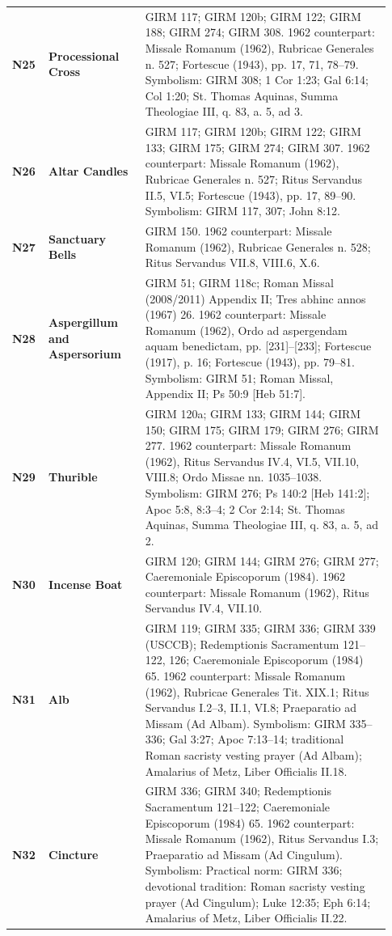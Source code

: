 {\begin{longtable}{>{\raggedright\arraybackslash}p{0.08\linewidth}>{\raggedright\arraybackslash}p{0.24\linewidth}>{\raggedright\arraybackslash}p{0.61\linewidth}}
\textbf{N25} & \textbf{Processional Cross} & GIRM 117; GIRM 120b; GIRM 122; GIRM 188; GIRM 274; GIRM 308. 1962 counterpart: Missale Romanum (1962), Rubricae Generales n. 527; Fortescue (1943), pp. 17, 71, 78--79. Symbolism: GIRM 308; 1 Cor 1:23; Gal 6:14; Col 1:20; St. Thomas Aquinas, Summa Theologiae III, q. 83, a. 5, ad 3. \\
\textbf{N26} & \textbf{Altar Candles} & GIRM 117; GIRM 120b; GIRM 122; GIRM 133; GIRM 175; GIRM 274; GIRM 307. 1962 counterpart: Missale Romanum (1962), Rubricae Generales n. 527; Ritus Servandus II.5, VI.5; Fortescue (1943), pp. 17, 89--90. Symbolism: GIRM 117, 307; John 8:12. \\
\textbf{N27} & \textbf{Sanctuary Bells} & GIRM 150. 1962 counterpart: Missale Romanum (1962), Rubricae Generales n. 528; Ritus Servandus VII.8, VIII.6, X.6. \\
\textbf{N28} & \textbf{Aspergillum and Aspersorium} & GIRM 51; GIRM 118c; Roman Missal (2008/2011) Appendix II; Tres abhinc annos (1967) 26. 1962 counterpart: Missale Romanum (1962), Ordo ad aspergendam aquam benedictam, pp. [231]--[233]; Fortescue (1917), p. 16; Fortescue (1943), pp. 79--81. Symbolism: GIRM 51; Roman Missal, Appendix II; Ps 50:9 [Heb 51:7]. \\
\textbf{N29} & \textbf{Thurible} & GIRM 120a; GIRM 133; GIRM 144; GIRM 150; GIRM 175; GIRM 179; GIRM 276; GIRM 277. 1962 counterpart: Missale Romanum (1962), Ritus Servandus IV.4, VI.5, VII.10, VIII.8; Ordo Missae nn. 1035--1038. Symbolism: GIRM 276; Ps 140:2 [Heb 141:2]; Apoc 5:8, 8:3--4; 2 Cor 2:14; St. Thomas Aquinas, Summa Theologiae III, q. 83, a. 5, ad 2. \\
\textbf{N30} & \textbf{Incense Boat} & GIRM 120; GIRM 144; GIRM 276; GIRM 277; Caeremoniale Episcoporum (1984). 1962 counterpart: Missale Romanum (1962), Ritus Servandus IV.4, VII.10. \\
\textbf{N31} & \textbf{Alb} & GIRM 119; GIRM 335; GIRM 336; GIRM 339 (USCCB); Redemptionis Sacramentum 121--122, 126; Caeremoniale Episcoporum (1984) 65. 1962 counterpart: Missale Romanum (1962), Rubricae Generales Tit. XIX.1; Ritus Servandus I.2--3, II.1, VI.8; Praeparatio ad Missam (Ad Albam). Symbolism: GIRM 335--336; Gal 3:27; Apoc 7:13--14; traditional Roman sacristy vesting prayer (Ad Albam); Amalarius of Metz, Liber Officialis II.18. \\
\textbf{N32} & \textbf{Cincture} & GIRM 336; GIRM 340; Redemptionis Sacramentum 121--122; Caeremoniale Episcoporum (1984) 65. 1962 counterpart: Missale Romanum (1962), Ritus Servandus I.3; Praeparatio ad Missam (Ad Cingulum). Symbolism: Practical norm: GIRM 336; devotional tradition: Roman sacristy vesting prayer (Ad Cingulum); Luke 12:35; Eph 6:14; Amalarius of Metz, Liber Officialis II.22. \\

\end{longtable}}
